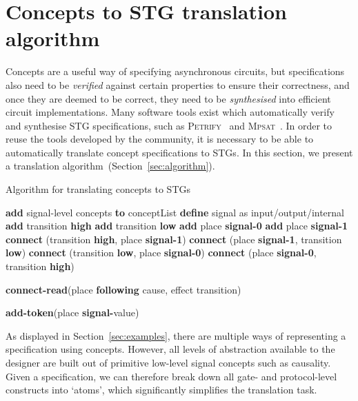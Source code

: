 \documentclass[british, journal]{IEEEtran}
\newcommand{\noun}[1]{\textsc{#1}}
\begin{document}
\vspace{-2mm}
\section{Concepts to STG translation algorithm\label{sec:algorithm}}

Concepts are a useful way of specifying asynchronous circuits, but
specifications also need to be \emph{verified} against certain properties to
ensure
their correctness, and once they are deemed to be correct, they need to
be \emph{synthesised} into efficient circuit implementations. Many software
tools exist which automatically verify and synthesise STG specifications,
such as \noun{Petrify}~\cite{Cortadella} and
\noun{Mpsat}~\cite{khomenko2004detecting}.
In order to reuse the tools developed by the community, it is
necessary to be able to automatically translate concept specifications to STGs.
In this section, we present a translation
algorithm~(Section~\ref{sec:algorithm}).

\begin{algorithm}[t]
\begin{algorithmic}
\caption{Algorithm for translating concepts to STGs\label{alg:translation}}
  \State \textbf{add} signal-level concepts \textbf{to} conceptList
\EndFor
  \State \textbf{define} signal as input/output/internal
  \State \textbf{add} transition \textbf{high}
  \State \textbf{add} transition \textbf{low}
  \State \textbf{add} place \textbf{signal-0}
  \State \textbf{add} place \textbf{signal-1}
  \State \textbf{connect} (transition \textbf{high}, place \textbf{signal-1})
  \State \textbf{connect} (place \textbf{signal-1}, transition \textbf{low})
  \State \textbf{connect} (transition \textbf{low}, place \textbf{signal-0})
  \State \textbf{connect} (place \textbf{signal-0}, transition \textbf{high})
\EndFor

\State \textbf{connect-read}(place \textbf{following} cause, effect transition)\EndFor

  \State \textbf{add-token}(place \textbf{signal-}value)
\EndFor

\end{algorithmic}
\end{algorithm}

As displayed in Section~\ref{sec:examples}, there are multiple ways of
representing a specification using concepts. However, all levels of
abstraction available to the designer are built out of primitive low-level
signal concepts such as causality. Given a specification, we can therefore
break down all gate- and protocol-level constructs into `atoms', which
significantly simplifies the translation task.
\end{document}

